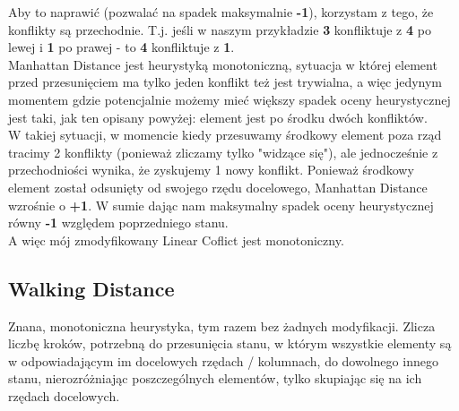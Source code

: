 \documentclass[12pt]{article}
\begin{document}
Aby to naprawić (pozwalać na spadek maksymalnie \textbf{-1}), korzystam z tego, że konflikty są przechodnie. 
T.j. jeśli w naszym przykładzie \textbf{3} konfliktuje z \textbf{4} po lewej i \textbf{1} po prawej - to \textbf{4} 
konfliktuje z \textbf{1}. \\

Manhattan Distance jest heurystyką monotoniczną, sytuacja w której element przed przesunięciem ma tylko jeden konflikt 
też jest trywialna, a więc jedynym momentem gdzie potencjalnie możemy mieć większy spadek oceny heurystycznej jest taki, jak 
ten opisany powyżej: element jest po środku dwóch konfliktów. \\

W takiej sytuacji, w momencie kiedy przesuwamy środkowy element poza rząd tracimy 2 konflikty (ponieważ zliczamy tylko "widzące się"), 
ale jednocześnie z przechodniości wynika, że zyskujemy 1 nowy konflikt. Ponieważ środkowy element został odsunięty od swojego 
rzędu docelowego, Manhattan Distance wzrośnie o \textbf{+1}. W sumie dając nam maksymalny spadek oceny heurystycznej równy \textbf{-1} 
względem poprzedniego stanu. \\

A więc mój zmodyfikowany Linear Coflict jest monotoniczny.

\subsection{Walking Distance}

Znana, monotoniczna heurystyka, tym razem bez żadnych modyfikacji. Zlicza liczbę kroków, potrzebną do przesunięcia stanu, 
w którym wszystkie elementy są w odpowiadającym im docelowych rzędach / kolumnach, do dowolnego innego stanu, nierozróżniając 
poszczególnych elementów, tylko skupiając się na ich rzędach docelowych. \\
\end{document}
